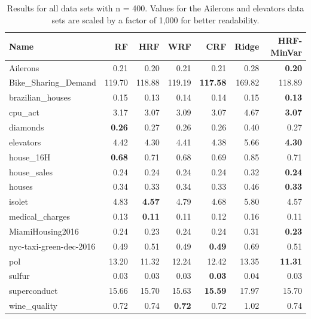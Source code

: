 \begin{table}[ht]
\centering
\begingroup\scriptsize
\begin{tabular}{lrrrrrr}
  \hline
\textbf{ Name } & \textbf{ RF } & \textbf{ HRF } & \textbf{ WRF } & \textbf{ CRF } & \textbf{ Ridge } & \textbf{ HRF-MinVar } \\ 
  \hline
Ailerons & 0.21 & 0.20 & 0.21 & 0.21 & 0.28 & \textbf{0.20} \\ 
  Bike\_Sharing\_Demand & 119.70 & 118.88 & 119.19 & \textbf{117.58} & 169.82 & 118.89 \\ 
  brazilian\_houses & 0.15 & 0.13 & 0.14 & 0.14 & 0.15 & \textbf{0.13} \\ 
  cpu\_act & 3.17 & 3.07 & 3.09 & 3.07 & 4.67 & \textbf{3.07} \\ 
  diamonds & \textbf{0.26} & 0.27 & 0.26 & 0.26 & 0.40 & 0.27 \\ 
  elevators & 4.42 & 4.30 & 4.41 & 4.38 & 5.66 & \textbf{4.30} \\ 
  house\_16H & \textbf{0.68} & 0.71 & 0.68 & 0.69 & 0.85 & 0.71 \\ 
  house\_sales & 0.24 & 0.24 & 0.24 & 0.24 & 0.32 & \textbf{0.24} \\ 
  houses & 0.34 & 0.33 & 0.34 & 0.33 & 0.46 & \textbf{0.33} \\ 
  isolet & 4.83 & \textbf{4.57} & 4.79 & 4.68 & 5.80 & 4.57 \\ 
  medical\_charges & 0.13 & \textbf{0.11} & 0.11 & 0.12 & 0.16 & 0.11 \\ 
  MiamiHousing2016 & 0.24 & 0.23 & 0.24 & 0.24 & 0.31 & \textbf{0.23} \\ 
  nyc-taxi-green-dec-2016 & 0.49 & 0.51 & 0.49 & \textbf{0.49} & 0.69 & 0.51 \\ 
  pol & 13.20 & 11.32 & 12.24 & 12.42 & 13.35 & \textbf{11.31} \\ 
  sulfur & 0.03 & 0.03 & 0.03 & \textbf{0.03} & 0.04 & 0.03 \\ 
  superconduct & 15.66 & 15.70 & 15.63 & \textbf{15.59} & 17.97 & 15.70 \\ 
  wine\_quality & 0.72 & 0.74 & \textbf{0.72} & 0.72 & 1.02 & 0.74 \\ 
   \hline
\end{tabular}
\endgroup
\caption{Results for all data sets with n = 400. Values for the Ailerons and elevators data sets are scaled by a factor of 1,000 for better readability.} 
\end{table}
